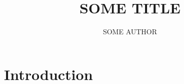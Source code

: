 \documentclass{ut-thesis}
\author{SOME AUTHOR}
\title{SOME TITLE}
\begin{document}
\maketitle

\section{Introduction}
\end{document}
